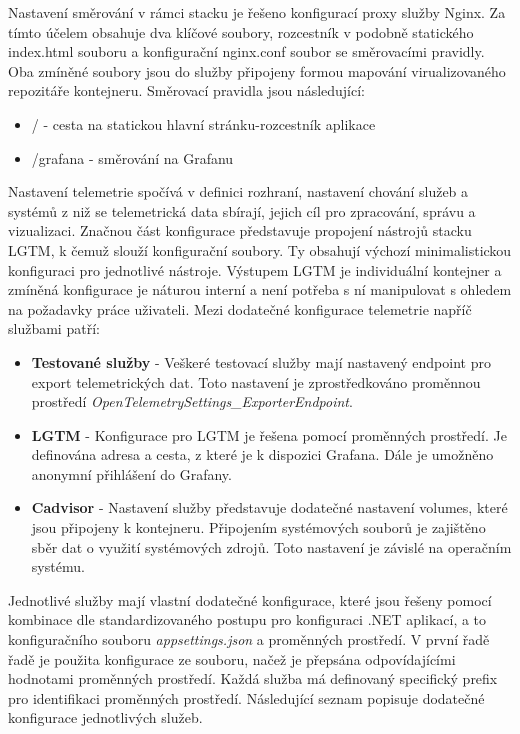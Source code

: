 Nastavení směrování v rámci stacku je řešeno konfigurací proxy služby Nginx. 
Za tímto účelem obsahuje dva klíčové soubory, rozcestník v podobně statického index.html souboru a konfigurační nginx.conf soubor se směrovacími pravidly. Oba zmíněné soubory jsou do služby připojeny formou mapování virualizovaného repozitáře kontejneru. Směrovací pravidla jsou následující:

\begin{itemize}
    \item / - cesta na statickou hlavní stránku-rozcestník aplikace
    \item /grafana - směrování na Grafanu
\end{itemize}

Nastavení telemetrie spočívá v definici rozhraní, nastavení chování služeb a systémů z niž se telemetrická data sbírají, jejich cíl pro zpracování, správu a vizualizaci. Značnou část konfigurace představuje propojení nástrojů stacku LGTM, k čemuž slouží konfigurační soubory. Ty obsahují výchozí minimalistickou konfiguraci pro jednotlivé nástroje. Výstupem LGTM je individuální kontejner a zmíněná konfigurace je náturou interní a není potřeba s ní manipulovat s ohledem na požadavky práce uživateli. Mezi dodatečné konfigurace telemetrie napříč službami patří:

\begin{itemize}
    \item \textbf{Testované služby} - Veškeré testovací služby mají nastavený endpoint pro export telemetrických dat. Toto nastavení je zprostředkováno proměnnou prostředí \emph{OpenTelemetrySettings\_ExporterEndpoint}.
    \item \textbf{LGTM} - Konfigurace pro LGTM je řešena pomocí proměnných prostředí. Je definována adresa a cesta, z které je k dispozici Grafana. Dále je umožněno anonymní přihlášení do Grafany.
    \item \textbf{Cadvisor} - Nastavení služby představuje dodatečné nastavení volumes, které jsou připojeny k kontejneru. Připojením systémových souborů je zajištěno sběr dat o využití systémových zdrojů. Toto nastavení je závislé na operačním systému.
\end{itemize}

Jednotlivé služby mají vlastní dodatečné konfigurace, které jsou řešeny pomocí kombinace dle standardizovaného postupu pro konfiguraci .NET aplikací, a to konfiguračního souboru \emph{appsettings.json} a proměnných prostředí. V první řadě řadě je použita konfigurace ze souboru, načež je přepsána odpovídajícími hodnotami proměnných prostředí. Každá služba má definovaný specifický prefix pro identifikaci proměnných prostředí. Následující seznam popisuje dodatečné konfigurace jednotlivých služeb.

